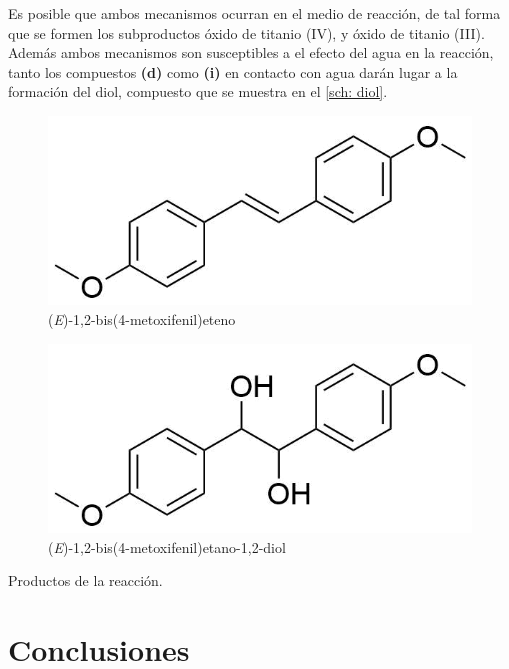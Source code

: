 \documentclass[fleqn,11pt]{SelfArx}
\begin{document}
Es posible que ambos mecanismos ocurran en el medio de reacci\'on, de tal forma que se formen los subproductos \'oxido de titanio (IV), y \'oxido de titanio (III). Adem\'as ambos mecanismos son susceptibles a el efecto del agua en la reacci\'on, tanto los compuestos \textbf{(d)} como \textbf{(i)} en contacto con agua dar\'an lugar a la formaci\'on del diol, compuesto que se muestra en el \autoref{sch: diol}.
\begin{scheme}[h]
	\centering
	\scriptsize
	\begin{subfigure}[t]{0.49\linewidth}
		\centering
		\includegraphics[width=0.9\linewidth]{structures/product.png}
		\caption{(\textit{E})-1,2-bis(4-metoxifenil)eteno}
		\label{sch: producto}
	\end{subfigure}
	\begin{subfigure}[t]{0.49\linewidth}
		\centering
		\includegraphics[width=0.9\linewidth]{structures/product2.png}
		\caption{(\textit{E})-1,2-bis(4-metoxifenil)etano-1,2-diol}
		\label{sch: diol}
	\end{subfigure}
	\caption{Productos de la reacci\'on.}
\end{scheme}

\section{Conclusiones}
\end{document}
